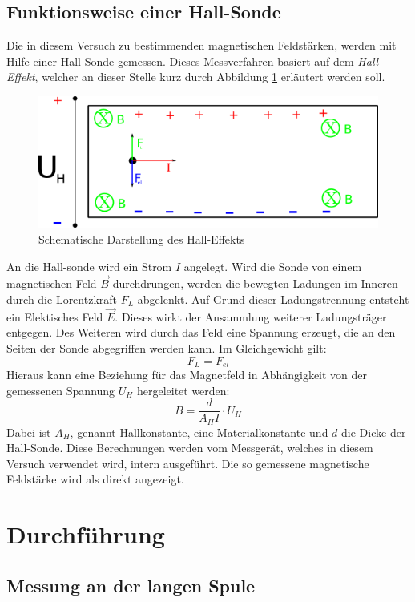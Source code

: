 \documentclass[11pt,ngerman,a4paper]{article}
\begin{document}
\subsection{Funktionsweise einer Hall-Sonde}
Die in diesem Versuch zu bestimmenden magnetischen Feldstärken, werden mit Hilfe einer Hall-Sonde gemessen. Dieses Messverfahren basiert auf dem \textit{Hall-Effekt}, welcher an dieser Stelle kurz durch Abbildung \ref{hall} erläutert werden soll.  
\begin{figure}[htp]
\centering
\includegraphics[scale=1.00]{hall.png}
\caption{Schematische Darstellung des Hall-Effekts}
\label{hall}
\end{figure}

An die Hall-sonde wird ein Strom $I$ angelegt. Wird die Sonde von einem magnetischen Feld $\vec B$ durchdrungen, werden die bewegten Ladungen im Inneren durch die Lorentzkraft $F_L$ abgelenkt. Auf Grund dieser Ladungstrennung entsteht ein Elektisches Feld $\vec E$. Dieses wirkt der Ansammlung weiterer Ladungsträger entgegen. Des Weiteren wird durch das Feld eine Spannung erzeugt, die an den Seiten der Sonde abgegriffen werden kann. Im Gleichgewicht gilt:
\[
F_L = F_{el}
\]
Hieraus kann eine Beziehung für das Magnetfeld in Abhängigkeit von der gemessenen Spannung $U_H$ hergeleitet werden:
\[
B = \frac{d}{A_H I } \cdot U_H
\]
Dabei ist $A_H$, genannt Hallkonstante, eine Materialkonstante und $d$ die Dicke der Hall-Sonde. 
Diese Berechnungen werden vom Messgerät, welches in diesem Versuch verwendet wird, intern ausgeführt. Die so gemessene magnetische Feldstärke wird als direkt angezeigt.
\section{Durchführung}
\subsection{Messung an der langen Spule}
\end{document}
